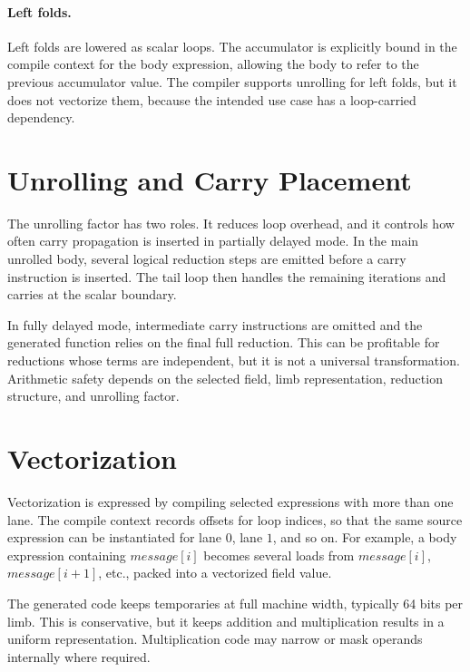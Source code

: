 \paragraph{Left folds.}
Left folds are lowered as scalar loops. The accumulator is explicitly bound in the compile context for the body expression, allowing the body to refer to the previous accumulator value. The compiler supports unrolling for left folds, but it does not vectorize them, because the intended use case has a loop-carried dependency.

\section{Unrolling and Carry Placement}
\label{sec:unrolling-carry}

The unrolling factor has two roles. It reduces loop overhead, and it controls how often carry propagation is inserted in partially delayed mode. In the main unrolled body, several logical reduction steps are emitted before a carry instruction is inserted. The tail loop then handles the remaining iterations and carries at the scalar boundary.

In fully delayed mode, intermediate carry instructions are omitted and the generated function relies on the final full reduction. This can be profitable for reductions whose terms are independent, but it is not a universal transformation. Arithmetic safety depends on the selected field, limb representation, reduction structure, and unrolling factor.

\section{Vectorization}
\label{sec:compiler-vectorization}

Vectorization is expressed by compiling selected expressions with more than one lane. The compile context records offsets for loop indices, so that the same source expression can be instantiated for lane \(0\), lane \(1\), and so on. For example, a body expression containing \(message[i]\) becomes several loads from \(message[i]\), \(message[i+1]\), etc., packed into a vectorized field value.

The generated code keeps temporaries at full machine width, typically 64 bits per limb. This is conservative, but it keeps addition and multiplication results in a uniform representation. Multiplication code may narrow or mask operands internally where required.

